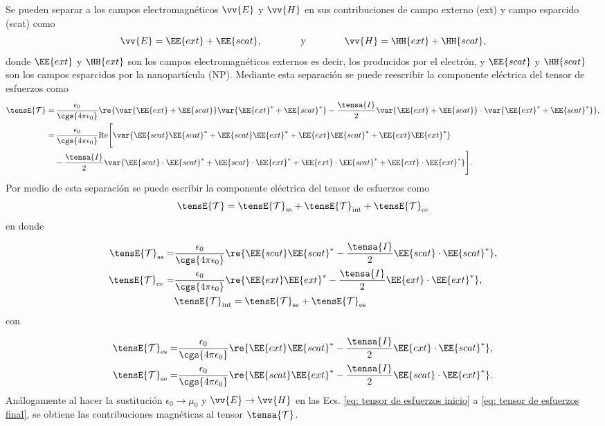 Se pueden separar a los campos electromagnéticos $\vv{E}$ y $\vv{H}$ en sus contribuciones de campo externo (ext) y campo esparcido (scat) como 
\begin{equation}
\vv{E} = \EE{ext} + \EE{scat}, \qquad\qquad \text{y} \qquad\qquad \vv{H} = \HH{ext} + \HH{scat},
\end{equation}
donde $\EE{ext}$ y $\HH{ext}$ son los campos electromagnéticos externos \textemdash es decir, los producidos por el electrón\textemdash, y $\EE{scat}$ y $\HH{scat}$ son los campos esparcidos por la nanopartícula (NP). Mediante esta separación se puede reescribir la componente eléctrica del tensor de esfuerzos como
\begin{align}
\tensE{\mathcal{T}}=&\,\frac{\epsilon_0}{\cgs{4\pi\epsilon_0}} \re{ \var{\EE{ext}+\EE{scat}}\var{\EE{ext}^{*}+\EE{scat}^{*}}-\frac{\tensa{I}}{2}\var{\EE{ext}+\EE{scat}}\cdot\var{\EE{ext}^{*}+\EE{scat}^{*}} },\nonumber \\
=& \, \frac{\epsilon_0}{\cgs{4\pi\epsilon_0}} {\rm Re} \Bigg[\var{\EE{scat}\EE{scat}^{*}+\EE{scat}\EE{ext}^{*}+\EE{ext}\EE{scat}^{*}+\EE{ext}\EE{ext}^{*}}\nonumber \\
&-\frac{\tensa{I}}{2}\var{\EE{scat}\cdot\EE{scat}^{*}+\EE{scat}\cdot\EE{ext}^{*}+\EE{ext}\cdot\EE{scat}^{*}+\EE{ext}\cdot\EE{ext}^{*}} \Bigg].
\label{eq: tensor de esfuerzos inicio}
\end{align}
Por medio de esta separación se puede escribir la componente eléctrica del tensor de esfuerzos como
\begin{equation}
\tensE{\mathcal{T}}=\tensE{\mathcal{T}}_{\rm ss}+\tensE{\mathcal{T}}_{\rm int}+\tensE{\mathcal{T}}_{\rm ee}
\end{equation}
en donde

\begin{align}
\tensE{\mathcal{T}}_{\rm ss} =& \frac{\epsilon_0}{\cgs{4\pi\epsilon_0}} \re{\EE{scat}\EE{scat}^{*}-\frac{\tensa{I}}{2}\EE{scat}\cdot\EE{scat}^{*}},\\
\tensE{\mathcal{T}}_{\rm ee} =& \frac{\epsilon_0}{\cgs{4\pi\epsilon_0}} \re{\EE{ext}\EE{ext}^{*}-\frac{\tensa{I}}{2}\EE{ext}\cdot\EE{ext}^{*}}, \\
&\tensE{\mathcal{T}}_{\rm int} = \tensE{\mathcal{T}}_{\rm se} + \tensE{\mathcal{T}}_{\rm es}
\end{align}
con

\begin{align}
\tensE{\mathcal{T}}_{\rm es} =& \frac{\epsilon_0}{\cgs{4\pi\epsilon_0}} \re{\EE{ext}\EE{scat}^{*}-\frac{\tensa{I}}{2}\EE{ext}\cdot\EE{scat}^{*}},\\
\tensE{\mathcal{T}}_{\rm se} =& \frac{\epsilon_0}{\cgs{4\pi\epsilon_0}} \re{\EE{scat}\EE{ext}^{*}-\frac{\tensa{I}}{2}\EE{scat}\cdot\EE{ext}^{*}}.
\label{eq: tensor de esfuerzos final}
\end{align}
Análogamente al hacer la sustitución $\epsilon_0 \to \mu_0$ y $\vv{E}\to\vv{H}$ en las Ecs. \eqref{eq: tensor de esfuerzos inicio} a \eqref{eq: tensor de esfuerzos final}, se obtiene las contribuciones magnéticas al tensor $\tensa{\mathcal{T}}$.
%
%
